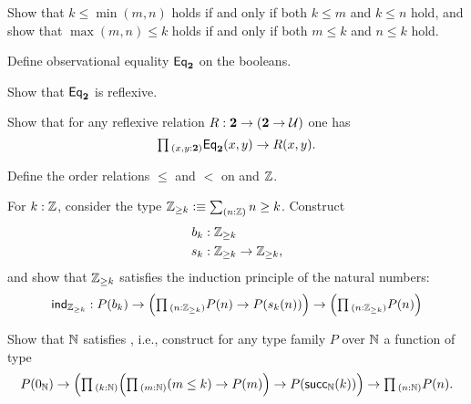\begin{exercises}
\begin{subexenum}
  \item Show that $k\leq \min(m,n)$ holds if and only if both $k\leq m$ and $k\leq n$ hold, and show that $\max(m,n)\leq k$ holds if and only if both $m\leq k$ and $n\leq k$ hold.
  \end{subexenum}
\item \label{ex:obs_bool}
  \begin{subexenum}
  \item Define observational equality $\mathsf{Eq}_\mathbf{2}$ on the booleans.
  \item Show that $\mathsf{Eq}_\mathbf{2}$ is reflexive.
  \item Show that for any reflexive relation $R:\mathbf{2}\to(\mathbf{2}\to \mathcal{U})$ one has
    \begin{equation*}
      \prd{x,y:\bool} \EqBool(x,y)\to R(x,y).
    \end{equation*}
  \end{subexenum}
\item \label{ex:int_order}
  \begin{subexenum}
  \item Define the order relations $\leq$ and $<$ on and ${\mathbb{Z}}$.
  \item For $k:{\mathbb{Z}}$, consider the type $\Z_{\geq k}\defeq \sm{n:\Z}n\geq k$. Construct
    \begin{align*}
      b_k & : {\mathbb{Z}}_{\geq k} \\
      s_k & : {\mathbb{Z}}_{\geq k}\to{\mathbb{Z}}_{\geq k},
    \end{align*}
    and show that ${\mathbb{Z}}_{\geq k}$ satisfies the induction principle of the natural numbers:
    \begin{equation*}
      \ind{\Z_{\geq k}} : P(b_k)\to \Big(\prd{n:\Z_{\geq k}} P(n)\to P(s_k(n))\Big)\to \Big(\prd{n:\Z_{\geq k}} P(n)\Big)
    \end{equation*}
  \end{subexenum}
\item
  \begin{subexenum}
  \item Show that ${\mathbb{N}}$ satisfies , i.e., construct for any type family $P$ over ${\mathbb{N}}$ a function of type
    \begin{equation*}
      P(\zeroN) \to \Big(\prd{k:\N}\Big(\prd{m:\N} (m\leq k) \to P(m)\Big)\to P(\succN(k))\Big) \to \prd{n:\N}P(n).

\end{equation*}
\end{subexenum}
\end{exercises}
